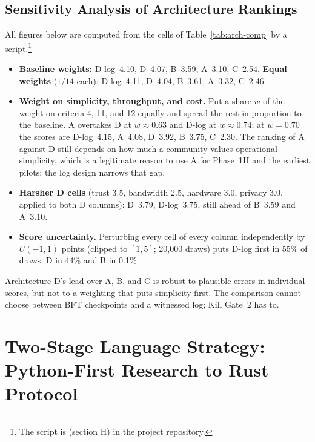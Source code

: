 \documentclass[10pt,twoside,openany]{book}
\theoremstyle{dpepstyle}
\begin{document}
\subsection{Sensitivity Analysis of Architecture Rankings}
\label{sec:arch-sensitivity}
All figures below are computed from the cells of Table~\ref{tab:arch-comp} by a script.\footnote{The script is  (section H) in the project repository.}
\begin{itemize}[leftmargin=1.6em,itemsep=1pt]
  \item \textbf{Baseline weights:} D-log~4.10, D~4.07, B~3.59, A~3.10, C~2.54. \textbf{Equal weights} ($1/14$ each): D-log~4.11, D~4.04, B~3.61, A~3.32, C~2.46.
  \item \textbf{Weight on simplicity, throughput, and cost.} Put a share $w$ of the weight on criteria 4, 11, and 12 equally and spread the rest in proportion to the baseline. A overtakes D at $w \approx 0.63$ and D-log at $w \approx 0.74$; at $w=0.70$ the scores are D-log~4.15, A~4.08, D~3.92, B~3.75, C~2.30. The ranking of A against D still depends on how much a community values operational simplicity, which is a legitimate reason to use A for Phase~1H and the earliest pilots; the log design narrows that gap.
  \item \textbf{Harsher D cells} (trust 3.5, bandwidth 2.5, hardware 3.0, privacy 3.0, applied to both D columns): D~3.79, D-log~3.75, still ahead of B~3.59 and A~3.10.
  \item \textbf{Score uncertainty.} Perturbing every cell of every column independently by $U(-1,1)$ points (clipped to $[1,5]$; 20,000 draws) puts D-log first in 55\% of draws, D in 44\% and B in 0.1\%.
\end{itemize}
Architecture D's lead over A, B, and C is robust to plausible errors in individual scores, but not to a weighting that puts simplicity first. The comparison cannot choose between BFT checkpoints and a witnessed log; Kill Gate~2 has to.

\section{Two-Stage Language Strategy: Python-First Research to Rust Protocol}
\end{document}
